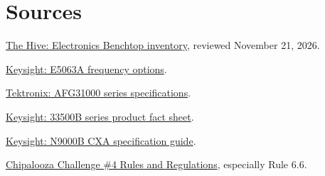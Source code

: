 \documentclass[10pt,letterpaper]{article}
\begin{document}
\section{Sources}

\begingroup
\small
\begin{enumerate}[label={[\arabic*]},nosep]
    \item \href{https://wiki.hivemakerspace.com/explore/electronics-benchtop/}{The Hive: Electronics Benchtop inventory}, reviewed November 21, 2026.
    \item \href{https://helpfiles.keysight.com/csg/e5063a/product_information/options.htm}{Keysight: E5063A frequency options}.
    \item \href{https://www.tek.com/en/datasheet/arbitrary-function-generators}{Tektronix: AFG31000 series specifications}.
    \item \href{https://www.keysight.com/content/dam/keysight/en/doc/ungate/product-fact-sheets/5991-0757.pdf}{Keysight: 33500B series product fact sheet}.
    \item \href{https://www.keysight.com/us/en/assets/9018-04781/technical-specifications/9018-04781.pdf}{Keysight: N9000B CXA specification guide}.
    \item \href{https://opencircuitdesign.com/chipalooza/rules-4.html}{Chipalooza Challenge \#4 Rules and Regulations}, especially Rule 6.6.
\end{enumerate}
\endgroup
\end{document}
